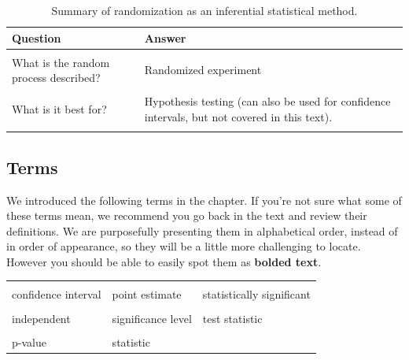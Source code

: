 \documentclass[
  10pt,
  openany]{book}
\begin{document}
\begin{table}[!h]

\caption{\label{tab:chp11-summary}Summary of randomization as an inferential statistical method.}
\centering
\begin{tabu} to 
\toprule
Question & Answer\\
\midrule
{} & \\
\addlinespace
What is the random process described? & Randomized experiment\\
\addlinespace
{} & \\
\addlinespace
What is it best for? & Hypothesis testing (can also be used for confidence intervals, but not covered in this text).\\
\addlinespace
{} & \\
\bottomrule
\end{tabu}
\end{table}

\hypertarget{terms-5}{%
\subsection{Terms}\label{terms-5}}

We introduced the following terms in the chapter.
If you're not sure what some of these terms mean, we recommend you go back in the text and review their definitions.
We are purposefully presenting them in alphabetical order, instead of in order of appearance, so they will be a little more challenging to locate.
However you should be able to easily spot them as \textbf{bolded text}.

\begin{tabu} to 
\toprule
{} &  & \\
confidence interval & point estimate & statistically significant\\
 &  & \\
independent & significance level & test statistic\\
 &  & \\
p-value & statistic & \\
\bottomrule
\end{tabu}
\end{document}
